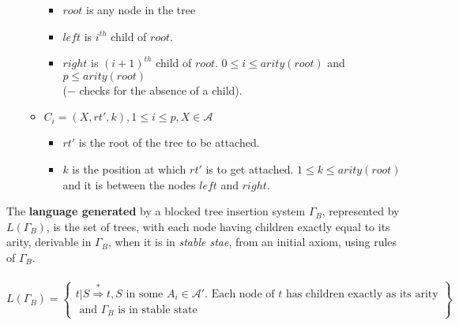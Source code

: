 \begin{definition}
\begin{itemize}
\begin{itemize}
\begin{itemize}
          			  \item $root$  is any node in the tree
            			\item $left $ is $i^{th}$ child of $root$.%
            			\item $right$ is  $(i+1)^{th}$ child of $root$.   $0\le i \le arity(root)$ and $p\leq arity(root)$\\
				($-$ checks for the absence of a child). %
                 	 \end{itemize}
       		 \item $C_i = (X,rt',k),1\leq i\leq p,X\in \mathcal{A}$ 
	             	\begin{itemize}    
               			 \item $rt'$ is the root of the tree to be attached.%
               			 \item $k$ is the position at which $rt'$ is to get attached. $1\le k \leq arity(root)$ and it is between the nodes $left$ 							and $right$.
           		  \end{itemize}
          \end{itemize}

	\end{itemize}
\end{definition}


The \textbf{language generated} by a  blocked tree insertion system $\Gamma_B$, represented by $L(\Gamma_B)$, is the set of trees,  
with each node having children exactly equal to its arity, derivable in $\Gamma_B$, when it is in \emph{stable stae},
 from an initial axiom, using rules of $\Gamma_B$.
\\\\
$L(\Gamma_B)=\begin{Bmatrix} t|S\overset{*}\Rightarrow t, S \mbox{ in some } A_i\in \mathcal{A} '. \mbox{ Each node of }t 
\mbox{ has children exactly as its arity}\\ \mbox{ and } \Gamma_B \mbox{ is in stable state}\end{Bmatrix}$\\


